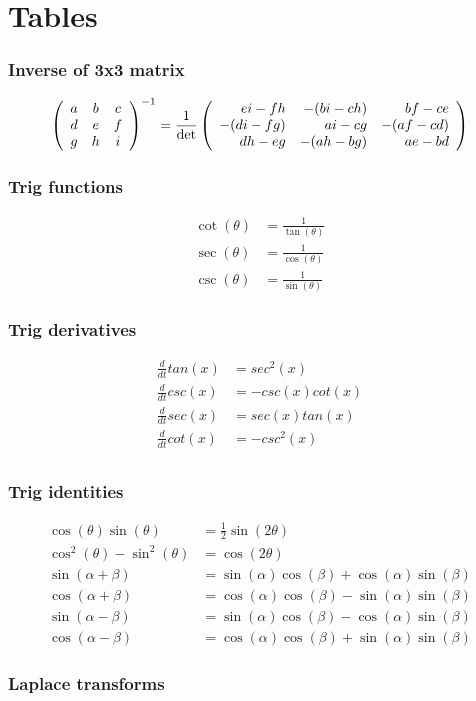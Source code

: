 \part{Tables}

\section{Inverse of 3x3 matrix}
\begin{equation}
\left(\begin{array}{ccc}
    a & b & c\\
    d & e & f\\
    g & h &i
\end{array}\right)^{-1}
=
{\frac{1}{\rm{det}}}
\left(\begin{array}{rrr}
    e i - f h & -(b i - c h) & b f - c e\\
    -(d i - f g) & a i - c g & -(a f -c d)\\
    d h - e g & -(a h - b g) & a e - b d
\end{array}\right)
\end{equation}


\section{Trig functions}
\begin{align}
    \cot(\theta) &= \frac{1}{\tan(\theta)}\\
    \sec(\theta) &= \frac{1}{\cos(\theta)}\\
    \csc(\theta) &= \frac{1}{\sin(\theta)}
\end{align}

\section{Trig derivatives}
\begin{align}
    \frac{d}{dt}tan(x) &= sec^2(x) \\
    \frac{d}{dt}csc(x) &= -csc(x)cot(x) \\
    \frac{d}{dt}sec(x) &= sec(x)tan(x) \\
    \frac{d}{dt}cot(x) &= -csc^2(x) \\
\end{align}



\section{Trig identities}
\begin{align}
    \cos(\theta)\sin(\theta) &= \frac{1}{2}\sin(2\theta)\\
    \cos^2(\theta)-\sin^2(\theta) &= \cos(2\theta)\\
    \sin(\alpha+\beta) &= \sin(\alpha)\cos(\beta) + \cos(\alpha)\sin(\beta)\\
    \cos(\alpha+\beta) &= \cos(\alpha)\cos(\beta) - \sin(\alpha)\sin(\beta)\\
    \sin(\alpha-\beta) &= \sin(\alpha)\cos(\beta) - \cos(\alpha)\sin(\beta)\\
    \cos(\alpha-\beta) &= \cos(\alpha)\cos(\beta) + \sin(\alpha)\sin(\beta)
\end{align}

\section{Laplace transforms}